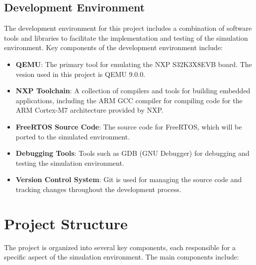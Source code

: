 \subsection{Development Environment}
The development environment for this project includes a combination of software tools and libraries to facilitate the implementation and testing of the simulation environment. Key components of the development environment include:
\begin{itemize}
    \item \textbf{QEMU}: The primary tool for emulating the NXP S32K3X8EVB board. The vesion used in this project is QEMU 9.0.0.
    \item \textbf{NXP Toolchain}: A collection of compilers and tools for building embedded applications, including the ARM GCC compiler for compiling code for the ARM Cortex-M7 architecture provided by NXP.
    \item \textbf{FreeRTOS Source Code}: The source code for FreeRTOS, which will be ported to the simulated environment.
    \item \textbf{Debugging Tools}: Tools such as GDB (GNU Debugger) for debugging and testing the simulation environment.
    \item \textbf{Version Control System}: Git is used for managing the source code and tracking changes throughout the development process.
\end{itemize}

\section{Project Structure}
The project is organized into several key components, each responsible for a specific aspect of the simulation environment. The main components include:


